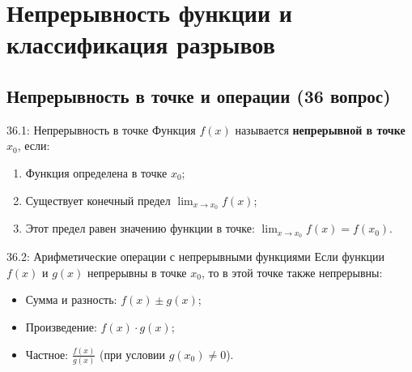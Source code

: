 \documentclass[a4paper,12pt]{article}
\begin{document}
	\newpage
	\section{Непрерывность функции и классификация разрывов}
	
	\subsection{Непрерывность в точке и операции (36 вопрос)}
	
	\begin{definitionbox}{36.1: Непрерывность в точке}
		Функция $f(x)$ называется \textbf{непрерывной в точке} $x_0$, если:
		\begin{enumerate}
			\item Функция определена в точке $x_0$;
			\item Существует конечный предел $\lim_{x \to x_0} f(x)$;
			\item Этот предел равен значению функции в точке: $\lim_{x \to x_0} f(x) = f(x_0)$.
		\end{enumerate}
	\end{definitionbox}
	
	\begin{theorembox}{36.2: Арифметические операции с непрерывными функциями}
		Если функции $f(x)$ и $g(x)$ непрерывны в точке $x_0$, то в этой точке также непрерывны:
		\begin{itemize}
			\item Сумма и разность: $f(x) \pm g(x)$;
			\item Произведение: $f(x) \cdot g(x)$;
			\item Частное: $\frac{f(x)}{g(x)}$ (при условии $g(x_0) \neq 0$).
		\end{itemize}
	\end{theorembox}
	
	\begin{center}
	\end{center}
	
\end{document}
